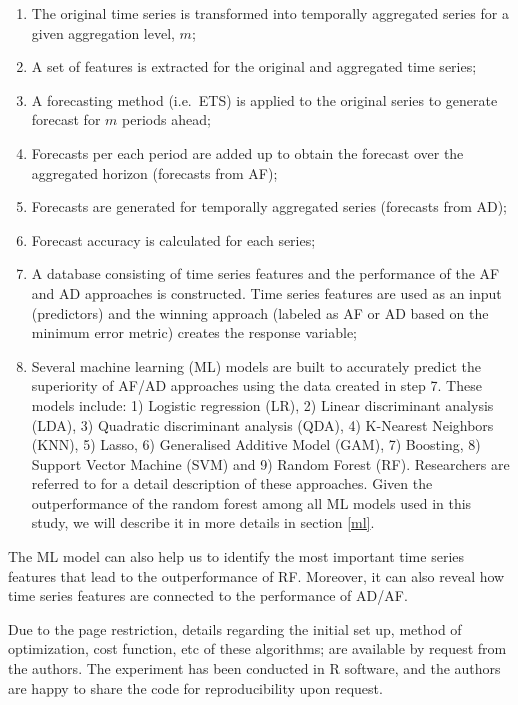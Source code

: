 \documentclass[preprint, 3p,
authoryear]{elsarticle} %
\begin{document}
\begin{enumerate}
\def\labelenumi{\arabic{enumi}.}
\item
  The original time series is transformed into temporally aggregated
  series for a given aggregation level, \(m\);
\item
  A set of features is extracted for the original and aggregated time
  series;
\item
  A forecasting method (i.e.~ETS) is applied to the original series to
  generate forecast for \(m\) periods ahead;
\item
  Forecasts per each period are added up to obtain the forecast over the
  aggregated horizon (forecasts from AF);
\item
  Forecasts are generated for temporally aggregated series (forecasts
  from AD);
\item
  Forecast accuracy is calculated for each series;
\item
  A database consisting of time series features and the performance of
  the AF and AD approaches is constructed. Time series features are used
  as an input (predictors) and the winning approach (labeled as AF or AD
  based on the minimum error metric) creates the response variable;
\item
  Several machine learning (ML) models are built to accurately predict
  the superiority of AF/AD approaches using the data created in step 7.
  These models include: 1) Logistic regression (LR), 2) Linear
  discriminant analysis (LDA), 3) Quadratic discriminant analysis (QDA),
  4) K-Nearest Neighbors (KNN), 5) Lasso, 6) Generalised Additive Model
  (GAM), 7) Boosting, 8) Support Vector Machine (SVM) and 9) Random
  Forest (RF). Researchers are referred to \citet{james2021statistical}
  for a detail description of these approaches. Given the outperformance
  of the random forest among all ML models used in this study, we will
  describe it in more details in section \ref{ml}.
\end{enumerate}

The ML model can also help us to identify the most important time series
features that lead to the outperformance of RF. Moreover, it can also
reveal how time series features are connected to the performance of
AD/AF.

Due to the page restriction, details regarding the initial set up,
method of optimization, cost function, etc of these algorithms; are
available by request from the authors. The experiment has been conducted
in R software, and the authors are happy to share the code for
reproducibility upon request.
\end{document}
